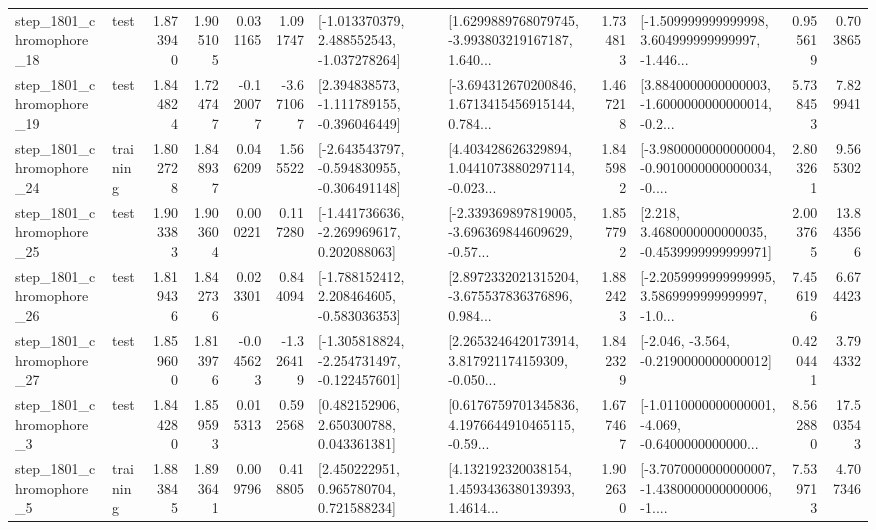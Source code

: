\begin{tabular}{llrrrrllrlrr}
 step\_1801\_chromophore\_18 &      test &      1.873940 &    1.905105 &      0.031165 &  1.091747 &   [-1.013370379, 2.488552543, -1.037278264] &  [1.6299889768079745, -3.993803219167187, 1.640... &       1.734813 &  [-1.509999999999998, 3.604999999999997, -1.446... &            0.955619 &          0.703865 \\
 step\_1801\_chromophore\_19 &      test &      1.844824 &    1.724747 &     -0.120077 & -3.671067 &   [2.394838573, -1.111789155, -0.396046449] &  [-3.694312670200846, 1.6713415456915144, 0.784... &       1.467218 &  [3.8840000000000003, -1.6000000000000014, -0.2... &            5.738453 &          7.829941 \\
 step\_1801\_chromophore\_24 &  training &      1.802728 &    1.848937 &      0.046209 &  1.565522 &  [-2.643543797, -0.594830955, -0.306491148] &  [4.403428626329894, 1.0441073880297114, -0.023... &       1.845982 &  [-3.9800000000000004, -0.9010000000000034, -0.... &            2.803261 &          9.565302 \\
 step\_1801\_chromophore\_25 &      test &      1.903383 &    1.903604 &      0.000221 &  0.117280 &   [-1.441736636, -2.269969617, 0.202088063] &  [-2.339369897819005, -3.696369844609629, -0.57... &       1.857792 &   [2.218, 3.4680000000000035, -0.4539999999999971] &            2.003765 &         13.843566 \\
 step\_1801\_chromophore\_26 &      test &      1.819436 &    1.842736 &      0.023301 &  0.844094 &   [-1.788152412, 2.208464605, -0.583036353] &  [2.8972332021315204, -3.675537836376896, 0.984... &       1.882423 &  [-2.2059999999999995, 3.5869999999999997, -1.0... &            7.456196 &          6.674423 \\
 step\_1801\_chromophore\_27 &      test &      1.859600 &    1.813976 &     -0.045623 & -1.326419 &  [-1.305818824, -2.254731497, -0.122457601] &  [2.2653246420173914, 3.817921174159309, -0.050... &       1.842329 &              [-2.046, -3.564, -0.2190000000000012] &            0.420441 &          3.794332 \\
  step\_1801\_chromophore\_3 &      test &      1.844280 &    1.859593 &      0.015313 &  0.592568 &     [0.482152906, 2.650300788, 0.043361381] &  [0.6176759701345836, 4.1976644910465115, -0.59... &       1.677467 &  [-1.0110000000000001, -4.069, -0.6400000000000... &            8.562880 &         17.503543 \\
  step\_1801\_chromophore\_5 &  training &      1.883845 &    1.893641 &      0.009796 &  0.418805 &     [2.450222951, 0.965780704, 0.721588234] &  [4.132192320038154, 1.4593436380139393, 1.4614... &       1.902630 &  [-3.7070000000000007, -1.4380000000000006, -1.... &            7.539713 &          4.707346 \\

\end{tabular}
